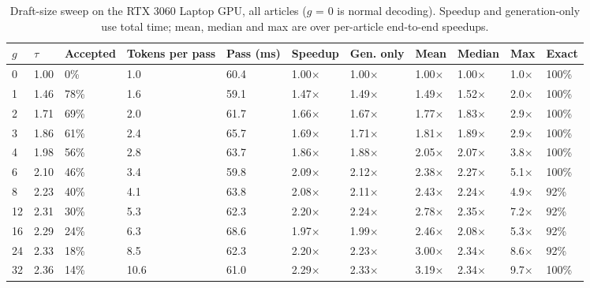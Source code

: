 \documentclass[11pt,a4paper]{article}
\begin{document}
\begin{table}[H]
\centering
\small
\caption{Draft-size sweep on the RTX 3060 Laptop GPU, all articles ($g$ = 0 is normal decoding). Speedup and generation-only use total time; mean, median and max are over per-article end-to-end speedups.}
\setlength{\tabcolsep}{4pt}
\begin{tabular}{L{0.81cm}L{0.90cm}L{1.54cm}L{1.36cm}L{1.17cm}L{1.45cm}L{1.26cm}L{1.08cm}L{1.26cm}L{1.08cm}L{1.08cm}}
\toprule
\textbf{$g$} & \textbf{$\tau$} & \textbf{Accepted} & \textbf{Tokens per pass} & \textbf{Pass (ms)} & \textbf{Speedup} & \textbf{Gen. only} & \textbf{Mean} & \textbf{Median} & \textbf{Max} & \textbf{Exact} \\
 & 1.00 & 0\% & 1.0 & 60.4 & 1.00$\times$ & 1.00$\times$ & 1.00$\times$ & 1.00$\times$ & 1.0$\times$ & 100\% \\
1 & 1.46 & 78\% & 1.6 & 59.1 & 1.47$\times$ & 1.49$\times$ & 1.49$\times$ & 1.52$\times$ & 2.0$\times$ & 100\% \\
2 & 1.71 & 69\% & 2.0 & 61.7 & 1.66$\times$ & 1.67$\times$ & 1.77$\times$ & 1.83$\times$ & 2.9$\times$ & 100\% \\
3 & 1.86 & 61\% & 2.4 & 65.7 & 1.69$\times$ & 1.71$\times$ & 1.81$\times$ & 1.89$\times$ & 2.9$\times$ & 100\% \\
4 & 1.98 & 56\% & 2.8 & 63.7 & 1.86$\times$ & 1.88$\times$ & 2.05$\times$ & 2.07$\times$ & 3.8$\times$ & 100\% \\
6 & 2.10 & 46\% & 3.4 & 59.8 & 2.09$\times$ & 2.12$\times$ & 2.38$\times$ & 2.27$\times$ & 5.1$\times$ & 100\% \\
8 & 2.23 & 40\% & 4.1 & 63.8 & 2.08$\times$ & 2.11$\times$ & 2.43$\times$ & 2.24$\times$ & 4.9$\times$ & 92\% \\
12 & 2.31 & 30\% & 5.3 & 62.3 & 2.20$\times$ & 2.24$\times$ & 2.78$\times$ & 2.35$\times$ & 7.2$\times$ & 92\% \\
16 & 2.29 & 24\% & 6.3 & 68.6 & 1.97$\times$ & 1.99$\times$ & 2.46$\times$ & 2.08$\times$ & 5.3$\times$ & 92\% \\
24 & 2.33 & 18\% & 8.5 & 62.3 & 2.20$\times$ & 2.23$\times$ & 3.00$\times$ & 2.34$\times$ & 8.6$\times$ & 92\% \\
32 & 2.36 & 14\% & 10.6 & 61.0 & 2.29$\times$ & 2.33$\times$ & 3.19$\times$ & 2.34$\times$ & 9.7$\times$ & 100\% \\
\bottomrule
\end{tabular}
\end{table}
\end{document}
